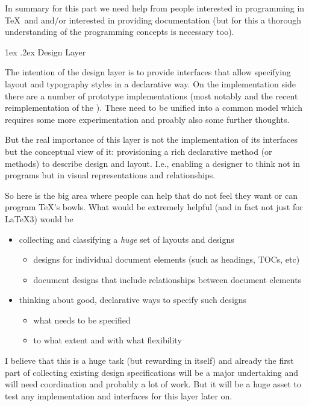 \documentclass{ltnews}
\makeatletter
\newcommand{\@subheadingfont}{%
   \sffamily\slshape
   \let\LaTeX\cmssLaTeX\let\TeX\cmssTeX
}
\renewcommand{\subsection}{%
   \@startsection
      {subsection}{2}{\z@}{-1.5ex \@plus -1ex \@minus -.2ex}%
      {1ex \@plus.2ex}{\@subheadingfont}%
}
\makeatother
\begin{document}
In summary for this part we need help from people interested in programming in \TeX\ and  and/or interested in providing documentation (but for this a thorough understanding of the programming concepts is necessary too).

\subsection{Design Layer}

The intention of the design layer is to provide interfaces that allow specifying layout and typography styles in a declarative way. On the implementation side there are a number of prototype implementations (most notably  and the recent reimplementation of the ).
These need to be unified into a common model which requires some more experimentation and proably also some further thoughts.

But the real importance of this layer is not the implementation of its interfaces but the conceptual view of it: provisioning a rich declarative method (or methods) to describe design and layout. I.e., enabling a designer to think not in programs but in visual representations and relationships.

So here is the big area where people can help that do not feel they want or can program \TeX's bowls. What would be extremely helpful (and in fact not just for \LaTeX3) would be
\begin{itemize}
\item collecting and classifying a \emph{huge} set of layouts and designs
\begin{itemize}[nosep]
\item designs for individual document elements (such as headings, TOCs, etc)
\item document designs that include relationships between document elements
\end{itemize}
\item thinking about good, declarative ways to specify such designs
\begin{itemize}[nosep]
\item what needs to be specified
\item to what extent and with what flexibility
\end{itemize}
\end{itemize}
I believe that this is a huge task (but rewarding in itself) and already the first part of collecting existing design specifications will be a major undertaking and will need coordination and probably a lot of work. But it will be a huge asset to test any implementation and interfaces for this layer later on.
\end{document}
